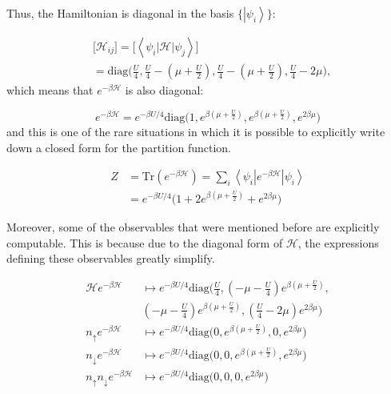 \documentclass[10pt, twocolumn, twoside]{article}
\begin{document}
Thus, the Hamiltonian is diagonal in the basis $\{\left| \psi_i \right\rangle \}$:

\begin{equation}
\begin{split}
&\bigg[ \mathcal{H}_{ij} \bigg] = \bigg[ \left\langle \psi_i \left| \mathcal{H} \right| \psi_j \right\rangle \bigg] \\
&= \text{diag}\bigg(\frac{U}{4}, \frac{U}{4} - (\mu + \frac{U}{2} ), \frac{U}{4} - (\mu + \frac{U}{2} ), \frac{U}{4} - 2 \mu \bigg) ,
\end{split}
\end{equation}
which means that $e^{-\beta \mathcal{H} }$ is also diagonal:

\begin{equation}
e^{-\beta \mathcal{H} } = e^{-\beta U / 4}  \text{diag}\bigg(1,  e^{\beta(\mu + \frac{U}{2})}, e^{\beta(\mu + \frac{U}{2})},  e^{2\beta \mu} \bigg)
\end{equation}
and this is one of the rare situations in which it is possible to explicitly write down a closed form for the partition function.

\begin{equation}
\begin{split}
Z &= \text{Tr} ( e^{-\beta\mathcal{H} } ) = \sum_i \left\langle \psi_i \left|e^{-\beta \mathcal{H} } \right| \psi_i \right\rangle \\
&= e^{-\beta U / 4} \bigg(1 + 2 e^{\beta(\mu + \frac{U}{2})} + e^{2 \beta \mu} \bigg)
\end{split}
\end{equation}

Moreover, some of the observables that were mentioned before are explicitly computable. This is because due to the diagonal form of $\mathcal{H}$, the expressions defining these observables greatly simplify.

\begin{equation}
\begin{split}
\mathcal{H} e^{-\beta\mathcal{H} } &\mapsto e^{-\beta U / 4}  \text{diag}\bigg(\frac{U}{4}, (-\mu - \frac{U}{4})  e^{\beta(\mu + \frac{U}{2})}, \\ 
&(-\mu - \frac{U}{4}) e^{\beta(\mu + \frac{U}{2})}, (\frac{U}{4} - 2\mu ) e^{2\beta \mu} \bigg) \\
n_{\uparrow} e^{-\beta\mathcal{H} } &\mapsto e^{-\beta U / 4}  \text{diag}\bigg(0, e^{\beta(\mu + \frac{U}{2})}, 0,  e^{2\beta \mu} \bigg) \\
n_{\downarrow} e^{-\beta\mathcal{H} } &\mapsto e^{-\beta U / 4}  \text{diag}\bigg(0, 0, e^{\beta(\mu + \frac{U}{2})},   e^{2\beta \mu} \bigg) \\
n_{\uparrow} n_{\downarrow} e^{-\beta\mathcal{H} } &\mapsto e^{-\beta U / 4}  \text{diag}\bigg(0, 0, 0,   e^{2\beta \mu} \bigg) \\
\end{split}
\end{equation}
\end{document}
